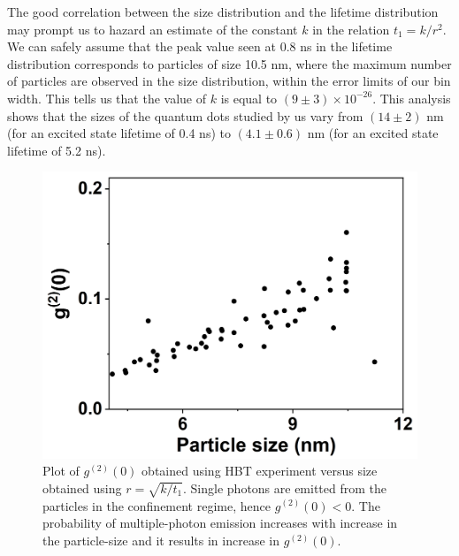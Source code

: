 \documentclass[%
 aip,
 amsmath,amssymb,
 reprint,%
]{revtex4-1}
\begin{document}
The good correlation between the size distribution and the lifetime distribution may prompt us to hazard an estimate of the constant $k$ in the relation $t_1 = k/r^2$. We can safely assume that the peak value seen at 0.8 ns in the lifetime distribution corresponds to particles of size 10.5 nm, where the maximum number of particles are observed in the size distribution, within the error limits of our bin width. This tells us that the value of $k$ is equal to $(9 \pm 3) \times 10^{-26}$. This analysis shows that the sizes of the quantum dots studied by us vary from $(14 \pm 2)$ nm (for an excited state lifetime of 0.4 ns) to $(4.1 \pm 0.6)$ nm (for an excited state lifetime of 5.2 ns).

\begin{figure}
    \centering
    \includegraphics[width=0.65\linewidth, height=0.55\linewidth]{g2 vs size1.png}
    \caption{Plot of $g^{(2)}(0)$ obtained using HBT experiment versus size obtained using $r = \sqrt{k/t_1}$. Single photons are emitted from the particles in the confinement regime, hence $g^{(2)}(0) < 0$. The probability of multiple-photon emission increases with increase in the particle-size and it results in increase in $g^{(2)} (0)$.}
    \label{fig:correlated size and lifetime}
\end{figure}
\end{document}
